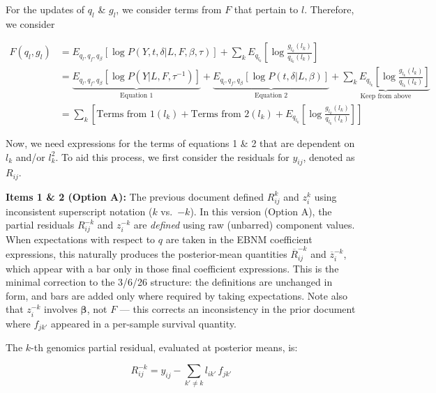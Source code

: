 \documentclass{article}[12pt]
\begin{document}
For the updates of $q_l$ \& $g_l$, we consider terms from $F$ that pertain to $l$. Therefore, we consider

\begin{align}
    F\left(q_l, g_l\right) &= E_{q_l, q_f, q_{\beta}}\left[\log P\left(Y, t, \delta \vert L, F, \beta, \tau\right)\right] + \sum_{k}E_{q_{l_k}}\left[\log \frac{g_{l_k}(l_k)}{q_{l_k}(l_k)}\right]\\
    &= \underbrace{E_{q_l, q_f, q_{\beta}}\left[\log P\left(Y \vert L, F, \tau^{-1}\right)\right]}_{\text{Equation 1}} + \underbrace{E_{q_l, q_f, q_{\beta}}\left[\log P\left(t, \delta \vert L, \beta\right)\right]}_{\text{Equation 2}} + \underbrace{\sum_{k}E_{q_{l_k}}\left[\log \frac{g_{l_k}(l_k)}{q_{l_k}(l_k)}\right]}_{\text{Keep from above}}\\
    &= \sum_{k}\left[\text{Terms from 1}(l_k) + \text{Terms from 2}(l_k) + E_{q_{l_k}}\left[\log \frac{g_{l_k}(l_k)}{q_{l_k}(l_k)}\right]\right]\label{SumTerm1:Term2}
\end{align}

Now, we need expressions for the terms of equations 1 \& 2 that are dependent on $l_k$ and/or $l_{k}^{2}$. To aid this process, we first consider the residuals for $y_{ij}$, denoted as $R_{ij}$.

\begin{corrbox}
\textbf{Items 1 \& 2 (Option A):} The previous document defined $R^{k}_{ij}$ and $z^{k}_{i}$
using inconsistent superscript notation ($k$ vs.\ $-k$). In this version (Option A), the partial
residuals $R^{-k}_{ij}$ and $z^{-k}_{i}$ are \emph{defined} using raw (unbarred) component
values. When expectations with respect to $q$ are taken in the EBNM coefficient expressions,
this naturally produces the posterior-mean quantities $\overline{R}^{-k}_{ij}$ and
$\overline{z}^{-k}_{i}$, which appear with a bar only in those final coefficient expressions.
This is the minimal correction to the 3/6/26 structure: the definitions are unchanged in form,
and bars are added only where required by taking expectations. Note also that $z^{-k}_{i}$
involves $\bm{\beta}$, not $F$ --- this corrects an inconsistency in the prior document where
$f_{jk'}$ appeared in a per-sample survival quantity.
\end{corrbox}

\medskip
The $k$-th genomics partial residual, evaluated at posterior means, is:

\begin{equation}\label{eq:Rk}
    R^{-k}_{ij} = y_{ij} - \sum_{k'\neq k} l_{ik'}\, f_{jk'}
\end{equation}
\end{document}
